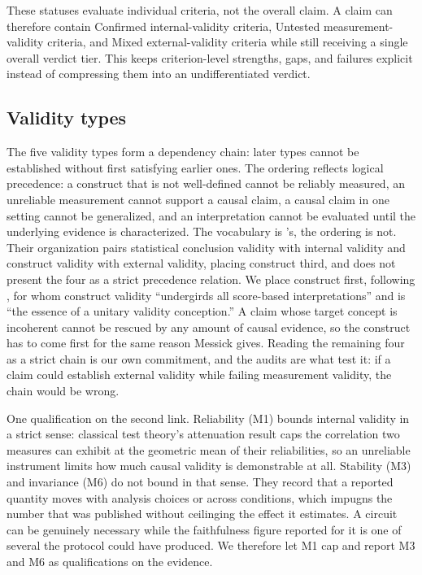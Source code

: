 \documentclass{article}
\begin{document}
These statuses evaluate individual criteria, not the overall claim. A claim can therefore contain Confirmed internal-validity criteria, Untested measurement-validity criteria, and Mixed external-validity criteria while still receiving a single overall verdict tier. This keeps criterion-level strengths, gaps, and failures explicit instead of compressing them into an undifferentiated verdict.

\subsection{Validity types}
\label{sec:validity-types}

The five validity types form a dependency chain: later types cannot be established without first satisfying earlier ones. The ordering reflects logical precedence: a construct that is not well-defined cannot be reliably measured, an unreliable measurement cannot support a causal claim, a causal claim in one setting cannot be generalized, and an interpretation cannot be evaluated until the underlying evidence is characterized. The vocabulary is \citeauthor{shadish2002experimental}'s, the ordering is not. Their organization pairs statistical conclusion validity with internal validity and construct validity with external validity, placing construct third, and does not present the four as a strict precedence relation. We place construct first, following \citet{messick1995validity}, for whom construct validity ``undergirds all score-based interpretations'' and is ``the essence of a unitary validity conception.'' A claim whose target concept is incoherent cannot be rescued by any amount of causal evidence, so the construct has to come first for the same reason Messick gives. Reading the remaining four as a strict chain is our own commitment, and the audits are what test it: if a claim could establish external validity while failing measurement validity, the chain would be wrong.

One qualification on the second link. Reliability (M1) bounds internal validity in a strict sense: classical test theory's attenuation result caps the correlation two measures can exhibit at the geometric mean of their reliabilities, so an unreliable instrument limits how much causal validity is demonstrable at all. Stability (M3) and invariance (M6) do not bound in that sense. They record that a reported quantity moves with analysis choices or across conditions, which impugns the number that was published without ceilinging the effect it estimates. A circuit can be genuinely necessary while the faithfulness figure reported for it is one of several the protocol could have produced. We therefore let M1 cap and report M3 and M6 as qualifications on the evidence.
\end{document}
